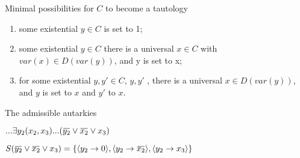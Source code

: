 \documentclass[xcolor=table	]{beamer}
\DeclarePairedDelimiter\ev{\langle}{\rangle}%
\newcommand{\ov}[1]{\mkern 1.5mu\overline{\mkern-1.5mu#1\mkern-1.5mu}\mkern 1.5mu}
\begin{document}
\begin{frame}{Minimal possibilities for $C$ to become a tautology}
    \begin{enumerate}
        \item some existential $y \in C$ is set to 1;
        \item some existential $y \in C$ there is a universal $x \in C$ with $var(x) \in  D(var(y))$, and y is set to x;
        \item for some existential $y, y' \in C$, $y, y'$ , there is a universal $x \in D(var(y))$, and $y$ is set to $x$ and $y'$ to $x$. 
    \end{enumerate}

\begin{exampleblock}{The admissible autarkies}

$...\exists y_2(x_2,x_3) ... (\ov{y_2} \vee \ov{x_2} \vee x_3)$ \newline
 
$S(\ov{y_2} \vee \ov{x_2} \vee x_3) = \{ \ev{y_2 \to 0}, \ev{y_2 \to \ov{x_2}}, \ev{y_2 \to x_3} \} $ 
\end{exampleblock}

\end{frame}
%
%
%
%
%
%
%
\end{document}
